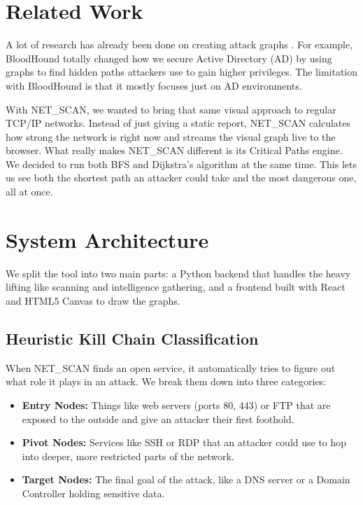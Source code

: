 \documentclass[conference]{IEEEtran}
\begin{document}
\section{Related Work}
A lot of research has already been done on creating attack graphs \cite{ammann2002}. For example, BloodHound \cite{bloodhound} totally changed how we secure Active Directory (AD) by using graphs to find hidden paths attackers use to gain higher privileges. The limitation with BloodHound is that it mostly focuses just on AD environments.

With NET\_SCAN, we wanted to bring that same visual approach to regular TCP/IP networks. Instead of just giving a static report, NET\_SCAN calculates how strong the network is right now and streams the visual graph live to the browser. What really makes NET\_SCAN different is its Critical Paths engine. We decided to run both BFS and Dijkstra's algorithm at the same time. This lets us see both the shortest path an attacker could take and the most dangerous one, all at once.

\section{System Architecture}
We split the tool into two main parts: a Python backend that handles the heavy lifting like scanning and intelligence gathering, and a frontend built with React and HTML5 Canvas to draw the graphs.

\subsection{Heuristic Kill Chain Classification}
When NET\_SCAN finds an open service, it automatically tries to figure out what role it plays in an attack. We break them down into three categories:
\begin{itemize}
    \item \textbf{Entry Nodes:} Things like web servers (ports 80, 443) or FTP that are exposed to the outside and give an attacker their first foothold.
    \item \textbf{Pivot Nodes:} Services like SSH or RDP that an attacker could use to hop into deeper, more restricted parts of the network.
    \item \textbf{Target Nodes:} The final goal of the attack, like a DNS server or a Domain Controller holding sensitive data.
\end{itemize}
\end{document}
